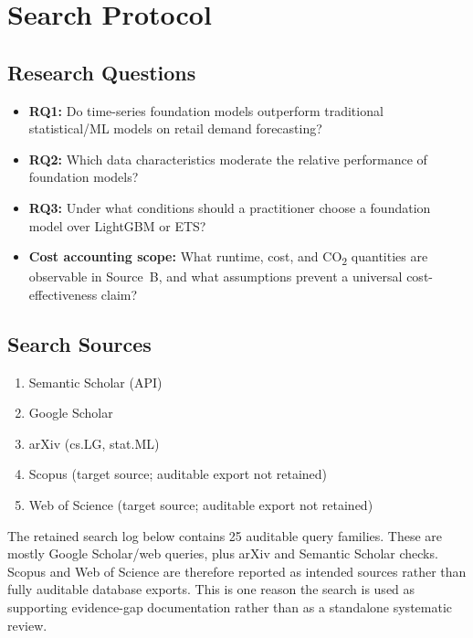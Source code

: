 \section{Search Protocol}\label{app:search}

\subsection{Research Questions}

\begin{itemize}[nosep]
  \item \textbf{RQ1:} Do time-series foundation models outperform
    traditional statistical/ML models on retail demand forecasting?
  \item \textbf{RQ2:} Which data characteristics moderate the relative
    performance of foundation models?
  \item \textbf{RQ3:} Under what conditions should a practitioner choose
    a foundation model over LightGBM or ETS?
  \item \textbf{Cost accounting scope:} What runtime, cost, and
    CO\textsubscript{2} quantities are observable in Source~B, and what
    assumptions prevent a universal cost-effectiveness claim?
\end{itemize}

\subsection{Search Sources}

\begin{enumerate}[nosep]
  \item Semantic Scholar (API)
  \item Google Scholar
  \item arXiv (cs.LG, stat.ML)
  \item Scopus (target source; auditable export not retained)
  \item Web of Science (target source; auditable export not retained)
\end{enumerate}

The retained search log below contains 25 auditable query families.  These
are mostly Google Scholar/web queries, plus arXiv and Semantic Scholar
checks.  Scopus and Web of Science are therefore reported as intended
sources rather than fully auditable database exports.  This is one reason the
search is used as supporting evidence-gap documentation rather than as a
standalone systematic review.

